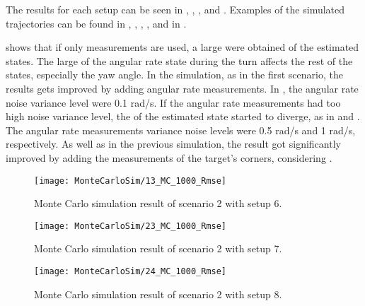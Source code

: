 The results for each setup can be seen in , , ,  and .
Examples of the simulated trajectories can be found in , , , ,  and  in .

 shows that if only \abbrROI measurements are used, a large \abbrRMSE were obtained of the estimated states.
The large \abbrRMSE of the angular rate state during the turn affects the rest of the states, especially the yaw angle.
In the simulation, as in the first scenario, the results gets improved by adding angular rate measurements.
In , the angular rate noise variance level were 0.1 rad/s.
If the angular rate measurements had too high noise variance level, the \abbrRMSE of the estimated state started to diverge, as in  and .
The angular rate measurements variance noise levels were 0.5 rad/s and 1 rad/s, respectively.
As well as in the previous simulation, the result got significantly improved by adding the measurements of the target's corners, considering .

\begin{figure}[!ht]
	\centering
	\texttt{[image: MonteCarloSim/13\_MC\_1000\_Rmse]}
	\caption{\label{fig:13montesimcrossingroirmse} Monte Carlo simulation result of scenario 2 with setup 6.}
\end{figure}

\begin{figure}[!ht]
	\centering
	\texttt{[image: MonteCarloSim/23\_MC\_1000\_Rmse]}
	\caption{\label{fig:23montesimcrossingroiangvelrmse} Monte Carlo simulation result of scenario 2 with setup 7.}
\end{figure}

\begin{figure}[!ht]
	\centering
	\texttt{[image: MonteCarloSim/24\_MC\_1000\_Rmse]}
	\caption{\label{fig:24montesimcrossingroiangvelrmse} Monte Carlo simulation result of scenario 2 with setup 8.}
\end{figure}

